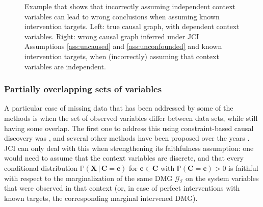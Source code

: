 \documentclass[twoside,11pt]{article}
\newcommand{\Prb}{\mathbb{P}}
\newcommand\B[1]{\bm{#1}}
\newcommand\C[1]{\mathcal{#1}}
\newcommand\given{\,|\,}
\begin{document}
\begin{figure}\centering
  \caption{Example that shows that incorrectly assuming independent context variables can lead to wrong conclusions when assuming known intervention targets. Left: true causal graph, with dependent context variables. Right: wrong causal graph inferred under JCI Assumptions \ref{ass:uncaused} and \ref{ass:unconfounded} and known intervention targets, when (incorrectly) assuming that context variables are independent.\label{fig:JCI_dependent_contexts2}}
\end{figure}

\subsubsection{Partially overlapping sets of variables}

A particular case of missing data that has been addressed by some of the methods
is when the set of observed variables differ between data sets, while still having some overlap.
The first one to address this using constraint-based causal discovery was \citet{ION2009},
and several other methods have been proposed over the years
\citep{Claassen++_NIPS2010,IOD2011,HEJ2014,triantafillou2015constraint}.
JCI can only deal with this when strengthening its faithfulness assumption: one would need to
assume that the context variables are discrete, and that every conditional distribution 
$\Prb(\B{X} \given \B{C}=\B{c})$ for $\B{c} \in \B{C}$ with $\Prb(\B{C}=\B{c})>0$ is 
faithful with respect to the marginalization of the same DMG $\C{G}_{\C{I}}$ on the
system variables that were observed in that context (or, in case of perfect interventions
with known targets, the corresponding marginal intervened DMG). 
\end{document}
